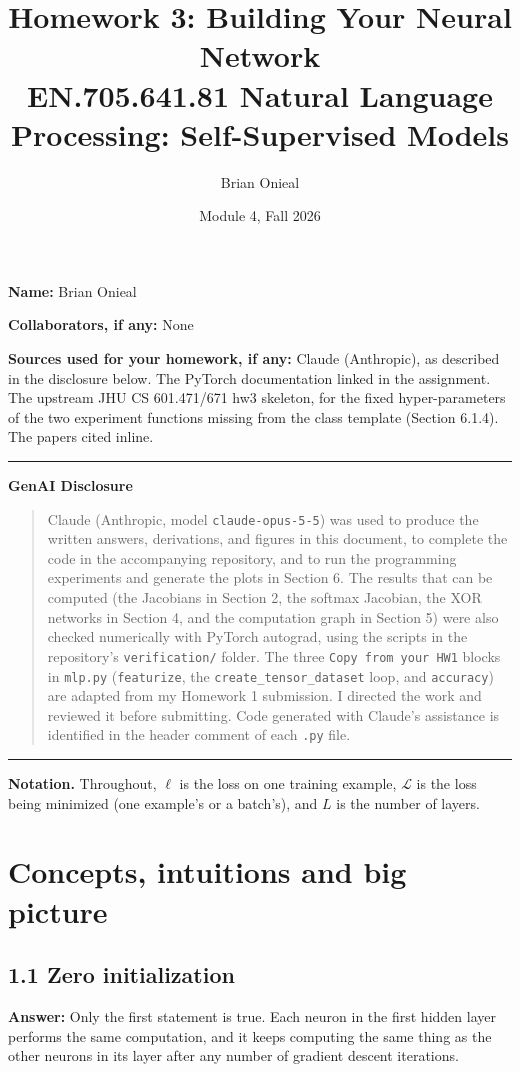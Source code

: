 \documentclass[11pt]{article}
\title{Homework 3: Building Your Neural Network\\[4pt]\large EN.705.641.81 Natural Language Processing: Self-Supervised Models}
\author{Brian Onieal}
\date{Module 4, Fall 2026}
\begin{document}
\maketitle

\textbf{Name:} Brian Onieal

\textbf{Collaborators, if any:} None

\textbf{Sources used for your homework, if any:} Claude (Anthropic), as described in the disclosure below. The PyTorch documentation linked in the assignment. The upstream JHU CS 601.471/671 hw3 skeleton, for the fixed hyper-parameters of the two experiment functions missing from the class template (Section 6.1.4). The papers cited inline.

\noindent\rule{0.6\textwidth}{0.4pt}

\textbf{GenAI Disclosure}
\begin{quote}
Claude (Anthropic, model \texttt{claude-opus-5-5}) was used to produce the written answers, derivations, and figures in this document, to complete the code in the accompanying repository, and to run the programming experiments and generate the plots in Section 6. The results that can be computed (the Jacobians in Section 2, the softmax Jacobian, the XOR networks in Section 4, and the computation graph in Section 5) were also checked numerically with PyTorch autograd, using the scripts in the repository's \texttt{verification/} folder. The three \texttt{Copy from your HW1} blocks in \texttt{mlp.py} (\texttt{featurize}, the \texttt{create\_tensor\_dataset} loop, and \texttt{accuracy}) are adapted from my Homework 1 submission. I directed the work and reviewed it before submitting. Code generated with Claude's assistance is identified in the header comment of each \texttt{.py} file.
\end{quote}
\noindent\rule{0.6\textwidth}{0.4pt}

\textbf{Notation.} Throughout, $\ell$ is the loss on one training example, $\mathcal{L}$ is the loss being minimized (one example's or a batch's), and $L$ is the number of layers.

\section{Concepts, intuitions and big picture}

\subsection*{1.1 Zero initialization}
\textbf{Answer:} Only the first statement is true. Each neuron in the first hidden layer performs the same computation, and it keeps computing the same thing as the other neurons in its layer after any number of gradient descent iterations.
\end{document}
